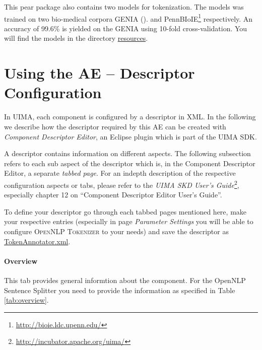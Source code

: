 \documentclass[11pt,a4paper,halfparskip]{scrartcl}
\begin{document}
This pear package also contains two models for tokenization. The
models was trained on two bio-medical corpora \textsc{GENIA} (\cite{ohta02}).
and PennBIoIE\footnote{\url{http://bioie.ldc.upenn.edu/}} respectively. An accuracy of 99.6\% is
yielded on the \textsc{GENIA} using 10-fold cross-validation.  You will find the models in the
directory \url{resources}.




\section{Using the AE -- Descriptor Configuration}

In UIMA, each component is configured by a descriptor in XML. In the
following we describe how the descriptor required by this AE can be
created with \emph{Component Descriptor Editor}, an Eclipse plugin
which is part of the UIMA SDK.

A descriptor contains information on different aspects. The following
subsection refers to each sub aspect of the descriptor which is, in
the Component Descriptor Editor, a separate \emph{tabbed page}. For an
indepth description of the respective configuration aspects or tabs,
please refer to the \emph{UIMA SKD User's
  Guide}\footnote{\url{http://incubator.apache.org/uima/}}, especially
chapter 12 on ``Component Descriptor Editor User's Guide''.

To define your descriptor go through each tabbed pages mentioned
here, make your respective entries (especially in page \emph{Parameter
Settings} you will be able to configure \textsc{OpenNLP Tokenizer} 
to your needs) and save the descriptor as \\ \url{TokenAnnotator.xml}.

\paragraph{Overview}
This tab provides general informtion about the component. For the
OpenNLP Sentence Splitter you need to provide the information as
specified in Table
\ref{tab:overview}.
\end{document}
